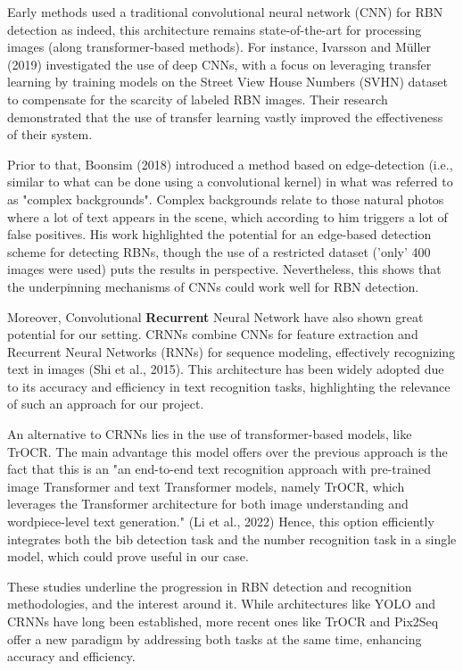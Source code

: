 \documentclass[twocolumn,superscriptaddress,aps]{revtex4-1}
\begin{document}
Early methods used a traditional convolutional neural network (CNN) for RBN detection as indeed, this architecture remains state-of-the-art for processing images (along transformer-based methods). For instance, Ivarsson and Müller (2019) investigated the use of deep CNNs, with a focus on leveraging transfer learning by training models on the Street View House Numbers (SVHN) dataset to compensate for the scarcity of labeled RBN images. Their research demonstrated that the use of transfer learning vastly improved the effectiveness of their system.\cite{ivarsson_racing_2019}

Prior to that, Boonsim (2018) introduced a method based on edge-detection (i.e., similar to what can be done using a convolutional kernel) in what was referred to as "complex backgrounds". Complex backgrounds relate to those natural photos where a lot of text appears in the scene, which according to him triggers a lot of false positives. His work highlighted the potential for an edge-based detection scheme for detecting RBNs, though the use of a restricted dataset ('only' 400 images were used) puts the results in perspective. Nevertheless, this shows that the underpinning mechanisms of CNNs could work well for RBN detection.\cite{boonsim_racing_2018}

Moreover, Convolutional \textbf{Recurrent} Neural Network have also shown great potential for our setting. CRNNs combine CNNs for feature extraction and Recurrent Neural Networks (RNNs) for sequence modeling, effectively recognizing text in images (Shi et al., 2015). This architecture has been widely adopted due to its accuracy and efficiency in text recognition tasks, highlighting the relevance of such an approach for our project.\cite{shi_end--end_2015}

An alternative to CRNNs lies in the use of transformer-based models, like TrOCR. The main advantage this model offers over the previous approach is the fact that this is an "an end-to-end text recognition approach with pre-trained image Transformer and text Transformer models, namely TrOCR, which leverages the Transformer architecture for both image understanding and wordpiece-level text generation." (Li et al., 2022) Hence, this option efficiently integrates both the bib detection task and the number recognition task in a single model, which could prove useful in our case.\cite{li_trocr_2022} 

These studies underline the progression in RBN detection and recognition methodologies, and the interest around it. While architectures like YOLO\cite{redmon_you_2016} and CRNNs have long been established, more recent ones like TrOCR\cite{li_trocr_2022} and Pix2Seq\cite{chen_pix2seq_2022} offer a new paradigm by addressing both tasks at the same time, enhancing accuracy and efficiency.
 




\end{document}
